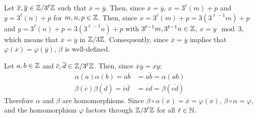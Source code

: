 \documentclass{article}
\begin{document}
Let $\overline{x}, \overline{y} \in \mathbb{Z}/3^\ell\mathbb{Z}$ such that $\overline{x} = \overline{y}$. Then, since $\overline{x} = \overline{y}$, $x = 3^\ell\left(m\right) + p$ and $y = 3^\ell\left(n\right) + p$ for $m, n, p \in \mathbb{Z}$. Then, since $x = 3^\ell\left(m\right) + p = 3\left(3^{\ell-1}m\right) + p$ and $y = 3^\ell\left(n\right) + p = 3\left(3^{\ell-1}n\right) + p$ with $3^{\ell-1}m, 3^{\ell-1}n \in \mathbb{Z}$, $x = y \mod 3$, which means that $\overline{x} = \overline{y}$ in $\mathbb{Z}/3\mathbb{Z}$. Consequently, since $\overline{x} = \overline{y}$ implies that $\varphi\left(\overline{x}\right) = \varphi\left(\overline{y}\right)$, $\beta$ is well-defined.

Let $a, b \in \mathbb{Z}$ and $\overline{c}, \overline{d} \in \mathbb{Z}/3^\ell\mathbb{Z}$. Then, since $\overline{x}\overline{y} = \overline{xy}$:
\begin{equation}
    \begin{split}
        \alpha\left(a\right)\alpha\left(b\right) = \overline{a}\overline{b} & = \overline{ab} = \alpha\left(ab\right) \\
        \beta\left(\overline{c}\right)\beta\left(\overline{d}\right) = \overline{c}\overline{d} & = \overline{cd} = \beta\left(\overline{cd}\right)
    \end{split}
\end{equation}
Therefore $\alpha$ and $\beta$ are homomorphisms. Since $\beta \circ \alpha \left(x\right) = \overline{x} = \varphi\left(x\right)$, $\beta \circ \alpha = \varphi$, and the homomorphism $\varphi$ factors through $\mathbb{Z}/3^\ell\mathbb{Z}$ for all $\ell \in \mathbb{N}$.
\end{document}
